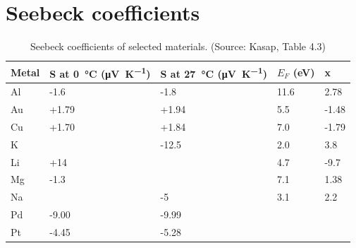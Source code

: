\section{Seebeck coefficients}
\begin{table}[ht!]
    \centering
    \begin{tabular}{lllll}
    Metal & S at \SI{0}{\degreeCelsius} (\si{\micro\volt\per\kelvin}) & S at \SI{27}{\degreeCelsius} (\si{\micro\volt\per\kelvin}) & $E_F$ (\si{\eV}) & x \\ \toprule
    Al   & -1.6    & -1.8   & 11.6 & 2.78    \\
    Au  & +1.79 & +1.94 & 5.5   & -1.48  \\
    Cu  & +1.70 & +1.84 & 7.0   & -1.79  \\
    K    &            &  -12.5 & 2.0   & 3.8      \\
    Li   & +14     &           & 4.7    & -9.7    \\
    Mg & -1.3    &           & 7.1    & 1.38     \\
    Na  &            & -5      & 3.1   & 2.2        \\
    Pd  & -9.00   & -9.99 &         &             \\
    Pt  & -4.45    & -5.28 &         &             \\ \bottomrule
    \end{tabular}
    \caption{Seebeck coefficients of selected materials. (Source: Kasap, Table 4.3)}
    \label{app:seebeck}
\end{table}